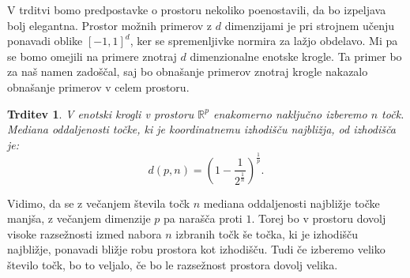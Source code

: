 \documentclass[12pt,a4paper,twoside]{article}
\theoremstyle{definition} %
\theoremstyle{plain} %
\newtheorem{trditev}[definicija]{Trditev}
\numberwithin{equation}{section}  %
\begin{document}
V trditvi bomo predpostavke o prostoru nekoliko poenostavili, da bo izpeljava bolj elegantna. 
Prostor možnih primerov z $d$ dimenzijami je pri strojnem učenju ponavadi oblike $[-1, 1]^d$, ker se spremenljivke normira za lažjo obdelavo. 
Mi pa se bomo omejili na primere znotraj $d$ dimenzionalne enotske krogle. 
Ta primer bo za naš namen zadoščal, saj bo obnašanje primerov znotraj krogle nakazalo obnašanje primerov v celem prostoru.

\begin{trditev}
V enotski krogli v prostoru $\mathbb{R}^p$ enakomerno naključno izberemo $n$ točk. Mediana oddaljenosti točke, ki je koordinatnemu izhodišču najbližja, od izhodišča je:
\[
d(p, n)  = (1 - \frac{1}{2^{\frac{1}{n}}})^{\frac{1}{p}}.
\]
\end{trditev}

Vidimo, da se z večanjem števila točk $n$ mediana oddaljenosti najbližje točke manjša, z večanjem dimenzije $p$ pa narašča proti $1$. 
Torej bo v prostoru dovolj visoke razsežnosti izmed nabora $n$ izbranih točk še točka, ki je izhodišču najbližje, ponavadi bližje robu prostora kot izhodišču. 
Tudi če izberemo veliko število točk, bo to veljalo, če bo le razsežnost prostora dovolj velika.
\end{document}
